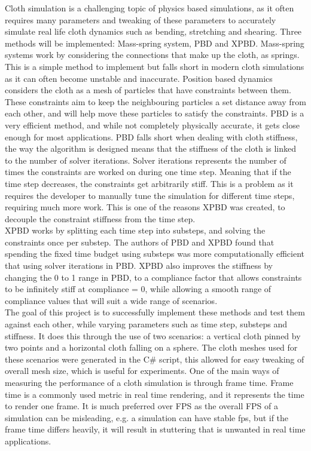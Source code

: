 \documentclass[12pt,a4paper]{article}
\begin{document}
Cloth simulation is a challenging topic of physics based simulations, as it often requires many parameters and tweaking of these parameters to accurately simulate real life cloth dynamics such as bending, stretching and shearing. Three methods will be implemented: Mass-spring system, PBD and XPBD. Mass-spring systems work by considering the connections that make up the cloth, as springs. This is a simple method to implement but falls short in modern cloth simulations as it can often become unstable and inaccurate. Position based dynamics considers the cloth as a mesh of particles that have constraints between them. These constraints aim to keep the neighbouring particles a set distance away from each other, and will help move these particles to satisfy the constraints. PBD is a very efficient method, and while not completely physically accurate, it gets close enough for most applications. PBD falls short when dealing with cloth stiffness, the way the algorithm is designed means that the stiffness of the cloth is linked to the number of solver iterations. Solver iterations represents the number of times the constraints are worked on during one time step. Meaning that if the time step decreases, the constraints get arbitrarily stiff. This is a problem as it requires the developer to manually tune the simulation for different time steps, requiring much more work. This is one of the reasons XPBD was created, to decouple the constraint stiffness from the time step. \\
XPBD works by splitting each time step into substeps, and solving the constraints once per substep. The authors of PBD and XPBD found that spending the fixed time budget using substeps was more computationally efficient that using solver iterations in PBD. XPBD also improves the stiffness by changing the 0 to 1 range in PBD, to a compliance factor that allows constraints to be infinitely stiff at compliance = 0, while allowing a smooth range of compliance values that will suit a wide range of scenarios.
\\

The goal of this project is to successfully implement these methods and test them against each other, while varying parameters such as time step, substeps and stiffness. It does this through the use of two scenarios: a vertical cloth pinned by two points and a horizontal cloth falling on a sphere. The cloth meshes used for these scenarios were generated in the C\# script, this allowed for easy tweaking of overall mesh size, which is useful for experiments. One of the main ways of measuring the performance of a cloth simulation is through frame time. Frame time is a commonly used metric in real time rendering, and it represents the time to render one frame. It is much preferred over FPS as the overall FPS of a simulation can be misleading, e.g. a simulation can have stable fps, but if the frame time differs heavily, it will result in stuttering that is unwanted in real time applications.
\\
\end{document}

